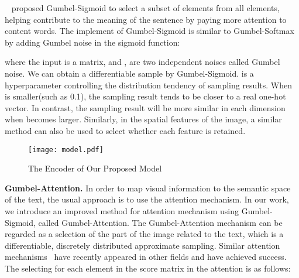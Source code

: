 \documentclass[11pt]{article}
\begin{document}
 ~\citet{DBLP:conf/acl/GengWWQLT20} proposed Gumbel-Sigmoid to select a subset of elements from all elements, helping contribute to the meaning of the sentence by paying more attention to content words. The implement of Gumbel-Sigmoid is similar to Gumbel-Softmax~\cite{DBLP:conf/iclr/JangGP17} by adding Gumbel noise in the sigmoid function:

where the input  is a matrix, and ,  are two independent noises called Gumbel noise. We can obtain a differentiable sample by Gumbel-Sigmoid. 
 is a hyperparameter controlling the distribution tendency of sampling results. When  is smaller(such as 0.1), the sampling result tends to be closer to a real one-hot vector. In contrast, the sampling result will be more similar in each dimension when  becomes larger.
Similarly, in the spatial features of the image, a similar method can also be used to select whether each feature is retained.

\begin{figure}[t]
\centering\texttt{[image: model.pdf]}
	\footnotesize\caption{The Encoder of Our Proposed Model} 
	\label{fig:02}
\end{figure}

\textbf{Gumbel-Attention.} In order to map visual information to the semantic space of the text, the usual approach is to use the attention mechanism. In our work, we introduce an improved method for attention mechanism using Gumbel-Sigmoid, called Gumbel-Attention. 
The Gumbel-Attention mechanism can be regarded as a selection of the part of the image related to the text, which is a differentiable, discretely distributed approximate sampling. 
Similar attention mechanisms~\citep{DBLP:conf/mm/ZhengLLZ020}  have recently appeared in other fields and have achieved success.
The selecting for each element in the score matrix in the attention is as follows:
\end{document}
